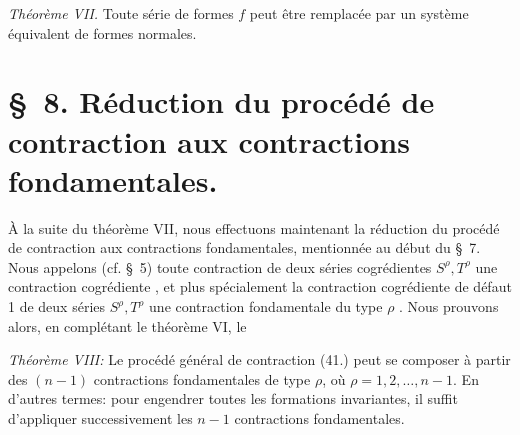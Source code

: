 \documentclass[11pt]{article}
\begin{document}
\emph{Théorème VII.} Toute série de formes $f$ peut être remplacée par un système équivalent de formes normales.

\section*{\S\ 8. Réduction du procédé de contraction aux contractions fondamentales.}
À la suite du théorème VII, nous effectuons maintenant la réduction du procédé de contraction aux contractions fondamentales, mentionnée au début du \S\ 7. Nous appelons (cf. \S\ 5) toute contraction de deux séries cogrédientes $S^\rho,T^\rho$ une \og{} contraction cogrédiente \fg{}, et plus spécialement la contraction cogrédiente de défaut 1 de deux séries $S^\rho,T^\rho$ une \og{} contraction fondamentale du type $\rho$ \fg{}. Nous prouvons alors, en complétant le théorème VI, le

\emph{Théorème VIII:} Le procédé général de contraction (41.) peut se composer à partir des $(n-1)$ contractions fondamentales de type $\rho$, où $\rho=1,2,\ldots,n-1$. En d'autres termes: pour engendrer toutes les formations invariantes, il suffit d'appliquer successivement les $n-1$ contractions fondamentales.
\end{document}
